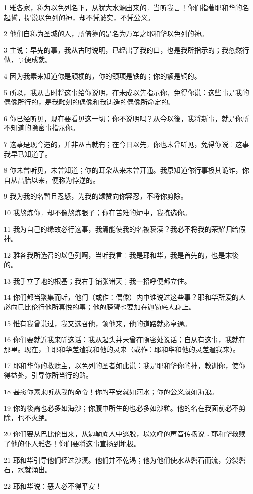 \par 1 雅各家，称为以色列名下，从犹大水源出来的，当听我言！你们指著耶和华的名起誓，提说以色列的神，却不凭诚实，不凭公义。
\par 2 他们自称为圣城的人，所倚靠的是名为万军之耶和华以色列的神。
\par 3 主说：早先的事，我从古时说明，已经出了我的口，也是我所指示的；我忽然行做，事便成就。
\par 4 因为我素来知道你是顽梗的，你的颈项是铁的；你的额是铜的。
\par 5 所以，我从古时将这事给你说明，在未成以先指示你，免得你说：这些事是我的偶像所行的，是我雕刻的偶像和我铸造的偶像所命定的。
\par 6 你已经听见，现在要看见这一切；你不说明吗？从今以後，我将新事，就是你所不知道的隐密事指示你。
\par 7 这事是现今造的，并非从古就有；在今日以先，你也未曾听见，免得你说：这事我早已知道了。
\par 8 你未曾听见，未曾知道；你的耳朵从来未曾开通。我原知道你行事极其诡诈，你自从出胎以来，便称为悖逆的。
\par 9 我为我的名暂且忍怒，为我的颂赞向你容忍，不将你剪除。
\par 10 我熬炼你，却不像熬炼银子；你在苦难的炉中，我拣选你。
\par 11 我为自己的缘故必行这事，我焉能使我的名被亵渎？我必不将我的荣耀归给假神。
\par 12 雅各我所选召的以色列啊，当听我言：我是耶和华，我是首先的，也是末後的。
\par 13 我手立了地的根基；我右手铺张诸天；我一招呼便都立住。
\par 14 你们都当聚集而听，他们（或作：偶像）内中谁说过这些事？耶和华所爱的人必向巴比伦行他所喜悦的事；他的膀臂也要加在迦勒底人身上。
\par 15 惟有我曾说过，我又选召他，领他来，他的道路就必亨通。
\par 16 你们要就近我来听这话：我从起头并未曾在隐密处说话；自从有这事，我就在那里。现在，主耶和华差遣我和他的灵来（或作：耶和华和他的灵差遣我来）。
\par 17 耶和华你的救赎主，以色列的圣者如此说：我是耶和华你的神，教训你，使你得益处，引导你所当行的路。
\par 18 甚愿你素来听从我的命令！你的平安就如河水；你的公义就如海浪。
\par 19 你的後裔也必多如海沙；你腹中所生的也必多如沙粒。他的名在我面前必不剪除，也不灭绝。
\par 20 你们要从巴比伦出来，从迦勒底人中逃脱，以欢呼的声音传扬说：耶和华救赎了他的仆人雅各！你们要将这事宣扬到地极。
\par 21 耶和华引导他们经过沙漠。他们并不乾渴；他为他们使水从磐石而流，分裂磐石，水就涌出。
\par 22 耶和华说：恶人必不得平安！

